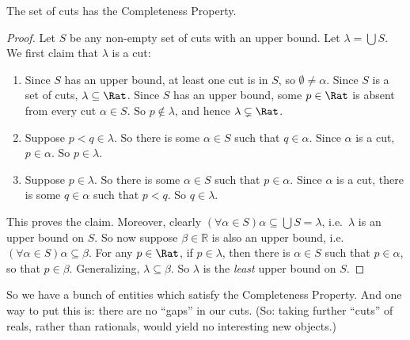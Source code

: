 \documentclass[../../../include/open-logic-section]{subfiles}
\begin{document}
\begin{thm}
The set of cuts has the Completeness Property. 
\end{thm}

\begin{proof}
Let $S$ be any non-empty set of cuts with an upper bound. Let $\lambda
= \bigcup S$. 
We first claim that $\lambda$ is a cut:
\begin{enumerate}
\item Since $S$ has an upper bound, at least one cut is in $S$, so
$\emptyset \neq \alpha$. Since $S$ is a set of cuts, $\lambda
\subseteq \Rat$. Since $S$ has an upper bound, some $p \in \Rat$ is
absent from every cut $\alpha \in S$. So $p\notin \lambda$, and hence
$\lambda \subsetneq \Rat$.
\item Suppose $p < q \in \lambda$. So there is some $\alpha \in S$
such that $q \in \alpha$. Since $\alpha$ is a cut, $p \in \alpha$. So
$p \in \lambda$.
\item Suppose $p \in \lambda$. So there is some $\alpha \in S$ such
that $p \in \alpha$. Since $\alpha$ is a cut, there is some $q \in
\alpha$ such that $p < q$. So $q \in \lambda$. 
\end{enumerate}
This proves the claim. Moreover, clearly $(\forall \alpha \in S)\alpha
\subseteq \bigcup S = \lambda$, i.e.\ $\lambda$ is an upper bound on $S$. So now suppose $\beta \in \mathbb{R}$ is also an upper bound, i.e.\ $(\forall \alpha \in S)\alpha \subseteq \beta$. For any $p \in \Rat$, if $p \in \lambda$, then there is $\alpha \in S$ such that $p \in \alpha$, so that $p \in \beta$. Generalizing, $\lambda \subseteq \beta$. So $\lambda$ is the \emph{least} upper bound on $S$.
\end{proof}

So we have a bunch of entities which satisfy the Completeness
Property. And one way to put this is: there are no ``gaps'' in our
cuts. (So: taking further ``cuts'' of reals, rather than rationals,
would yield no interesting new objects.)
\end{document}
